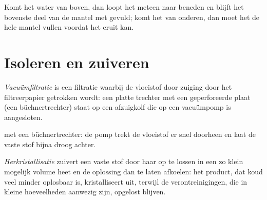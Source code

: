 \begin{remark}\label{rem:g10:synthesis-yield:water}
Komt het water van boven, dan loopt het meteen naar beneden en blijft
het bovenste deel van de mantel met  gevuld; komt het van onderen,
dan moet het de hele mantel vullen voordat het eruit kan.
\end{remark}

\section{Isoleren en zuiveren}

\begin{definition}[Vacuümfiltratie]\label{def:g10:synthesis-yield:vacuum-filtration}
\emph{Vacuümfiltratie} is een filtratie waarbij de
vloeistof door zuiging door het filtreerpapier getrokken wordt: een
platte trechter met een geperforeerde plaat (een büchnertrechter) staat
op een afzuigkolf die op een vacuümpomp is aangesloten.
\end{definition}

\begin{omfigure}

{\small {} met een büchnertrechter: de pomp trekt de
vloeistof er snel doorheen en laat de vaste stof bijna droog achter.}
\end{omfigure}

\begin{definition}[Herkristallisatie]\label{def:g10:synthesis-yield:recrystallisation}
\emph{Herkristallisatie} zuivert een vaste stof
door haar op te lossen in een zo klein mogelijk volume heet
 en de oplossing dan te laten afkoelen: het product, dat koud
veel minder oplosbaar is, kristalliseert uit, terwijl de
verontreinigingen, die in kleine hoeveelheden aanwezig zijn, opgelost
blijven.
\end{definition}

